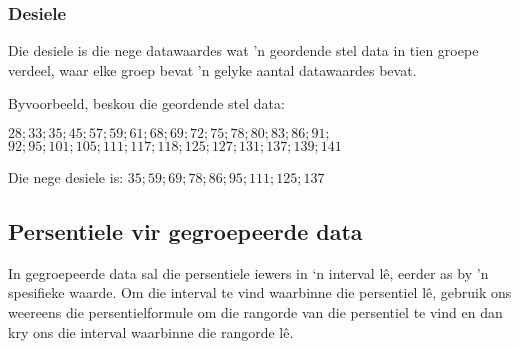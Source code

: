 \subsubsection*{Desiele}
Die desiele is die nege datawaardes wat 'n geordende stel data in tien groepe verdeel, waar elke groep bevat 'n gelyke aantal datawaardes bevat.

\par
Byvoorbeeld, beskou die geordende stel data:
\begin{center}
$28; 33; 35; 45; 57; 59; 61; 68; 69; 72; 75; 78; 80; 83; 86; 91;$ \\ 
$92; 95; 101; 105; 111; 117; 118; 125; 127; 131; 137; 139; 141$\\
\end{center}
Die nege desiele is: $35; 59; 69; 78; 86; 95; 111; 125; 137$


\subsection{Persentiele vir gegroepeerde data}

In gegroepeerde data sal die persentiele iewers in ‘n interval lê, eerder as by ’n spesifieke waarde. Om die interval te vind waarbinne die persentiel lê, gebruik ons weereens die persentielformule om die rangorde van die persentiel te vind en dan kry ons die interval waarbinne die rangorde l\^e.


